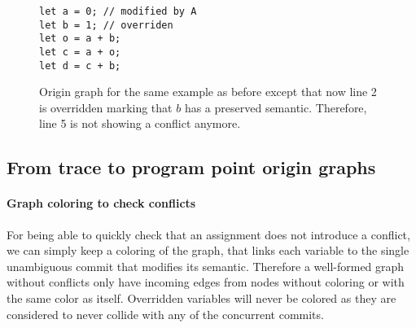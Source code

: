 \documentclass[a4paper,10pt]{article}
\begin{document}
\begin{figure}[ht]
\begin{minipage}{.5\textwidth}
\begin{lstlisting}
let a = 0; // modified by A
let b = 1; // overriden
let o = a + b;
let c = a + o;
let d = c + b;
\end{lstlisting}
\end{minipage}\hfill
\begin{minipage}{.45\textwidth}
\centering{}
\end{minipage}
\caption{Origin graph for the same example as before except that now line 2 is
overridden marking that $b$ has a preserved semantic. Therefore, line 5 is not showing a conflict anymore.}
\end{figure}

\subsection{From trace to program point origin graphs}
\paragraph{Graph coloring to check conflicts} For being able to quickly check that an assignment does not introduce a conflict, we can simply keep a coloring of the graph, that links each variable to the single unambiguous commit that modifies its semantic.
Therefore a well-formed graph without conflicts only have incoming edges from nodes without coloring or with the same color as itself.
Overridden variables will never be colored as they are considered to never collide with any of the concurrent commits.
\end{document}
